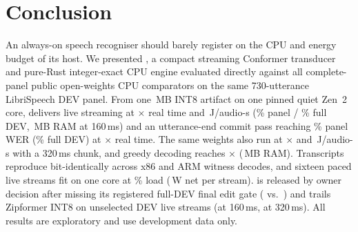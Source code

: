 \section{Conclusion}\label{sec:conclusion}

An always-on speech recogniser should barely register on the CPU and energy budget of its host. We
presented \ultra{}, a compact streaming Conformer transducer and pure-Rust integer-exact CPU engine
evaluated directly against all \ColdCompleteCompCount{} complete-panel public open-weights CPU
comparators on the same 730-utterance LibriSpeech DEV panel. From one \ColdHeadModel\,MB INT8 artifact on one
pinned quiet Zen~2 core, \ultra{} delivers live streaming at \ColdLiveSpeed$\times$ real time and
\ColdLiveWatts\,J/audio-s (\ColdLiveWer\% panel / \CandLiveLmFullWer\% full DEV, \ColdLiveRss\,MB RAM
at 160\,ms) and an utterance-end commit pass reaching \ColdHeadWer\% panel WER (\CandFinalFullWer\%
full DEV) at \ColdHeadSpeed$\times$ real time. The same weights also run at \VsWideSpeed$\times$ and
\VsWideWatts\,J/audio-s with a 320\,ms chunk, and greedy decoding reaches \VsGreedySpeed$\times$
(\ColdRcTwoLiveGreedyRss\,MB RAM). Transcripts reproduce bit-identically across \CandIsaRuns{} x86 and
ARM witness decodes, and sixteen paced live streams fit on one core at \RelCapSixteenBusy\% load
(\RelCapSixteenNetW\,W net per stream). \ultra{} is released by owner decision after missing its
registered full-DEV final edit gate (\CandFinalFullEdits{} vs.\ \CandGateFinalFull) and trails
Zipformer INT8 on unselected DEV live streams (\CandLiveLmCDelta\pp at 160\,ms,
\CandLiveLmEightCDelta\pp at 320\,ms). All results are exploratory and use development data only.
